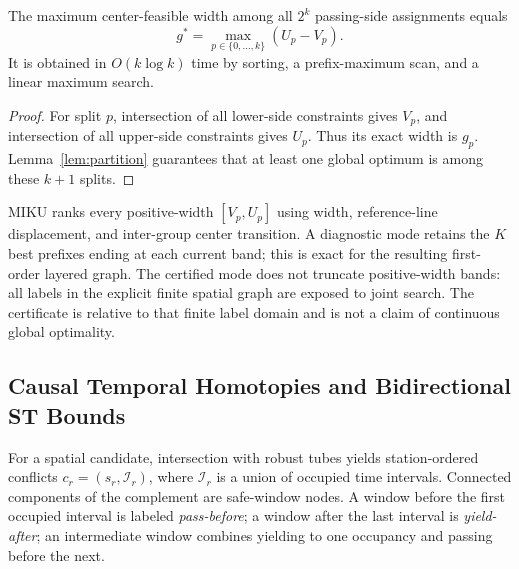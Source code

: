 \begin{theorem}
The maximum center-feasible width among all $2^k$ passing-side assignments equals
\begin{equation}
 g^*=\max_{p\in\{0,\ldots,k\}}(U_p-V_p).
\end{equation}
It is obtained in $O(k\log k)$ time by sorting, a prefix-maximum scan, and a linear maximum search.
\label{thm:maxgap}
\end{theorem}
\begin{proof}
For split $p$, intersection of all lower-side constraints gives $V_p$, and intersection of all upper-side constraints gives $U_p$. Thus its exact width is $g_p$. Lemma~\ref{lem:partition} guarantees that at least one global optimum is among these $k+1$ splits.
\end{proof}

MIKU ranks every positive-width $[V_p,U_p]$ using width, reference-line displacement, and inter-group center transition. A diagnostic mode retains the $K$ best prefixes ending at each current band; this is exact for the resulting first-order layered graph. The certified mode does not truncate positive-width bands: all labels in the explicit finite spatial graph are exposed to joint search. The certificate is relative to that finite label domain and is not a claim of continuous global optimality.

\subsection{Causal Temporal Homotopies and Bidirectional ST Bounds}

For a spatial candidate, intersection with robust tubes yields station-ordered conflicts $c_r=(s_r,\mathcal I_r)$, where $\mathcal I_r$ is a union of occupied time intervals. Connected components of the complement are safe-window nodes. A window before the first occupied interval is labeled \emph{pass-before}; a window after the last interval is \emph{yield-after}; an intermediate window combines yielding to one occupancy and passing before the next.

